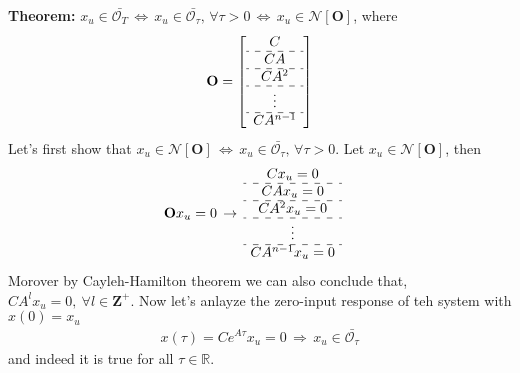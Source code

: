 \documentclass[twoside]{article}
\begin{document}
\textbf{Theorem:} $x_u \in \bar{\mathcal{O}_T} \, \iff \, 
x_u \in \bar{\mathcal{O}_{\tau}} , \, \forall \tau > 0 \, \iff \, 
x_u \in \mathcal{N}[ \mathbf{O} ]$, where 
%
\begin{align*}
  \mathbf{O} = \left[ 
  \begin{array}{c}
    C 
    \\ \hdashline
    C A 
    \\ \hdashline
    C A^2
    \\ \hdashline
    \vdots
    \\ \hdashline
    C A^{n-1}
  \end{array}
  \right]
\end{align*}
%
Let's first show that $x_u \in \mathcal{N}[ \mathbf{O} ] \, \iff \, x_u \in \bar{\mathcal{O}_{\tau}} , \, \forall \tau > 0$. Let $x_u \in \mathcal{N}[ \mathbf{O} ]$, then  
%
\begin{align*}
  \mathbf{O} x_u &= 0
  \, 
    \rightarrow
  \,
  \begin{array}{c}
    C x_u = 0
    \\ \hdashline
    C A x_u = 0
    \\ \hdashline
    C A^2 x_u = 0
    \\ \hdashline
    \vdots
    \\ \hdashline
    C A^{n-1} x_u = 0
  \end{array}
\end{align*}
%
Morover by Cayleh-Hamilton theorem we can also conclude that, $C A^{l} x_u = 0 , \ \forall l \in \mathbf{Z}^+$. Now let's anlayze the zero-input response of teh system with $x(0) = x_u$
%
\begin{align*}
  x(\tau) = C e^{A \tau} x_u = 0 \, \Rightarrow \, x_u \in \bar{\mathcal{O}_{\tau}}
\end{align*}
%
and indeed it is true for all $\tau \in \mathbb{R}$.

\end{document}
